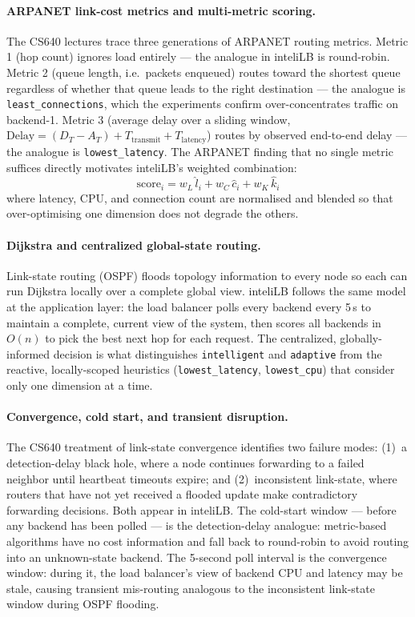 \documentclass[12pt]{article}
\begin{document}
\paragraph{ARPANET link-cost metrics and multi-metric scoring.}
The CS640 lectures trace three generations of ARPANET routing metrics.
Metric 1 (hop count) ignores load entirely — the analogue in inteliLB is
round-robin. Metric 2 (queue length, i.e.\ packets enqueued) routes toward the
shortest queue regardless of whether that queue leads to the right destination —
the analogue is \texttt{least\_connections}, which the experiments confirm
over-concentrates traffic on backend-1. Metric 3 (average delay over a sliding
window, $\text{Delay} = (D_T - A_T) + T_{\text{transmit}} + T_{\text{latency}}$)
routes by observed end-to-end delay — the analogue is \texttt{lowest\_latency}.
The ARPANET finding that no single metric suffices directly motivates
inteliLB's weighted combination:
\[
  \text{score}_i = w_L\,\hat{l}_i + w_C\,\hat{c}_i + w_K\,\hat{k}_i
\]
where latency, CPU, and connection count are normalised and blended so that
over-optimising one dimension does not degrade the others.

\paragraph{Dijkstra and centralized global-state routing.}
Link-state routing (OSPF) floods topology information to every node so each
can run Dijkstra locally over a complete global view. inteliLB follows the same
model at the application layer: the load balancer polls every backend every 5\,s
to maintain a complete, current view of the system, then scores all backends in
$O(n)$ to pick the best next hop for each request. The centralized, globally-informed
decision is what distinguishes \texttt{intelligent} and \texttt{adaptive} from
the reactive, locally-scoped heuristics (\texttt{lowest\_latency},
\texttt{lowest\_cpu}) that consider only one dimension at a time.

\paragraph{Convergence, cold start, and transient disruption.}
The CS640 treatment of link-state convergence identifies two failure modes:
(1)~a detection-delay black hole, where a node continues forwarding to a failed
neighbor until heartbeat timeouts expire; and (2)~inconsistent link-state, where
routers that have not yet received a flooded update make contradictory forwarding
decisions. Both appear in inteliLB. The cold-start window — before any backend
has been polled — is the detection-delay analogue: metric-based algorithms have
no cost information and fall back to round-robin to avoid routing into an
unknown-state backend. The 5-second poll interval is the convergence window:
during it, the load balancer's view of backend CPU and latency may be stale,
causing transient mis-routing analogous to the inconsistent link-state window
during OSPF flooding.
\end{document}
